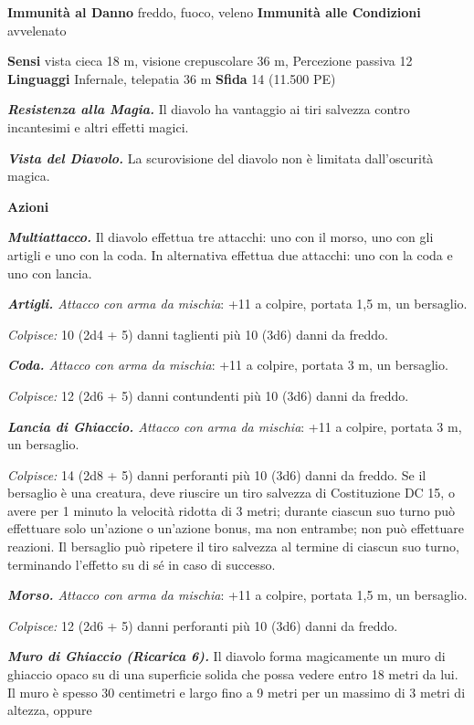 \begin{multicols}{2}
\textbf{Immunità al Danno} freddo, fuoco, veleno \textbf{Immunità alle
Condizioni} avvelenato

\textbf{Sensi} vista cieca 18 m, visione crepuscolare 36 m, Percezione passiva
12 \textbf{Linguaggi} Infernale, telepatia 36 m \textbf{Sfida} 14
(11.500 PE)

\emph{\textbf{Resistenza alla Magia.}} Il diavolo ha vantaggio ai tiri
salvezza contro incantesimi e altri effetti magici.

\emph{\textbf{Vista del Diavolo.}} La scurovisione del diavolo non è
limitata dall'oscurità magica.

\textbf{Azioni}

\emph{\textbf{Multiattacco.}} Il diavolo effettua tre attacchi: uno con
il morso, uno con gli artigli e uno con la coda. In alternativa effettua
due attacchi: uno con la coda e uno con lancia.

\emph{\textbf{Artigli.} Attacco con arma da mischia}: +11 a colpire,
portata 1,5 m, un bersaglio.

\emph{Colpisce:} 10 (2d4 + 5) danni taglienti più 10 (3d6) danni da
freddo.

\emph{\textbf{Coda.} Attacco con arma da mischia}: +11 a colpire,
portata 3 m, un bersaglio.

\emph{Colpisce:} 12 (2d6 + 5) danni contundenti più 10 (3d6) danni da
freddo.

\emph{\textbf{Lancia di Ghiaccio.} Attacco con arma da mischia}: +11 a
colpire, portata 3 m, un bersaglio.

\emph{Colpisce:} 14 (2d8 + 5) danni perforanti più 10 (3d6) danni da
freddo. Se il bersaglio è una creatura, deve riuscire un tiro salvezza
di Costituzione DC 15, o avere per 1 minuto la velocità ridotta di 3
metri; durante ciascun suo turno può effettuare solo un'azione o
un'azione bonus, ma non entrambe; non può effettuare reazioni. Il
bersaglio può ripetere il tiro salvezza al termine di ciascun suo turno,
terminando l'effetto su di sé in caso di successo.

\emph{\textbf{Morso.} Attacco con arma da mischia}: +11 a colpire,
portata 1,5 m, un bersaglio.

\emph{Colpisce:} 12 (2d6 + 5) danni perforanti più 10 (3d6) danni da
freddo.




\emph{\textbf{Muro di Ghiaccio (Ricarica 6).}} Il diavolo forma
magicamente un muro di ghiaccio opaco su di una superficie solida che
possa vedere entro 18 metri da lui. Il muro è spesso 30 centimetri e
largo fino a 9 metri per un massimo di 3 metri di altezza, oppure



\end{multicols}
